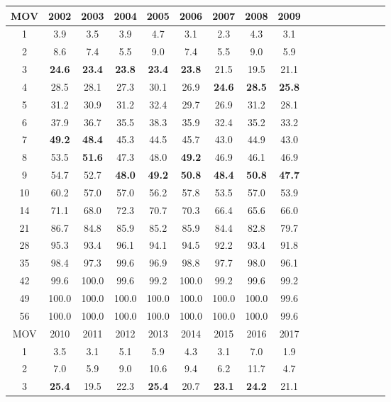 \documentclass[11pt]{article}
\begin{document}
\begin{table}[!htb]
\begin{center}
\scriptsize
\begin{tabular}{|c|c|c|c|c|c|c|c|c|c|c|c|c|c|c|c|c|}
\hline
MOV & 2002 & 2003 & 2004 & 2005 & 2006 & 2007 & 2008 & 2009 \\
\hline
1 & 3.9 & 3.5 & 3.9 & 4.7 & 3.1 & 2.3 & 4.3 & 3.1\\
2 & 8.6 & 7.4 & 5.5 & 9.0 & 7.4 & 5.5 & 9.0 & 5.9\\
3 & \textbf{24.6} & \textbf{23.4} & \textbf{23.8} & \textbf{23.4} & \textbf{23.8} & 21.5 & 19.5 & 21.1\\
4 & 28.5 & 28.1 & 27.3 & 30.1 & 26.9 & \textbf{24.6} & \textbf{28.5} & \textbf{25.8}\\
5 & 31.2 & 30.9 & 31.2 & 32.4 & 29.7 & 26.9 & 31.2 & 28.1\\
6 & 37.9 & 36.7 & 35.5 & 38.3 & 35.9 & 32.4 & 35.2 & 33.2\\
7 & \textbf{49.2} & \textbf{48.4} & 45.3 & 44.5 & 45.7 & 43.0 & 44.9 & 43.0\\
8 & 53.5 & \textbf{51.6} & 47.3 & 48.0 & \textbf{49.2} & 46.9 & 46.1 & 46.9\\
9 & 54.7 & 52.7 & \textbf{48.0} & \textbf{49.2} & \textbf{50.8} & \textbf{48.4} & \textbf{50.8} & \textbf{47.7}\\
10 & 60.2 & 57.0 & 57.0 & 56.2 & 57.8 & 53.5 & 57.0 & 53.9\\
14 & 71.1 & 68.0 & 72.3 & 70.7 & 70.3 & 66.4 & 65.6 & 66.0\\
21 & 86.7 & 84.8 & 85.9 & 85.2 & 85.9 & 84.4 & 82.8 & 79.7\\
28 & 95.3 & 93.4 & 96.1 & 94.1 & 94.5 & 92.2 & 93.4 & 91.8\\
35 & 98.4 & 97.3 & 99.6 & 96.9 & 98.8 & 97.7 & 98.0 & 96.1\\
42 & 99.6 & 100.0 & 99.6 & 99.2 & 100.0 & 99.2 & 99.6 & 99.2\\
49 & 100.0 & 100.0 & 100.0 & 100.0 & 100.0 & 100.0 & 100.0 & 99.6\\
56 & 100.0 & 100.0 & 100.0 & 100.0 & 100.0 & 100.0 & 100.0 & 99.6\\
\hline
\hline
MOV & 2010 & 2011 & 2012 & 2013 & 2014 & 2015 & 2016 & 2017 \\
\hline
1 & 3.5 & 3.1 & 5.1 & 5.9 & 4.3 & 3.1 & 7.0 & 1.9\\
2 & 7.0 & 5.9 & 9.0 & 10.6 & 9.4 & 6.2 & 11.7 & 4.7\\
3 & \textbf{25.4} & 19.5 & 22.3 & \textbf{25.4} & 20.7 & \textbf{23.1} & \textbf{24.2} & 21.1\\

\end{tabular}
\end{center}
\end{table}
\end{document}
